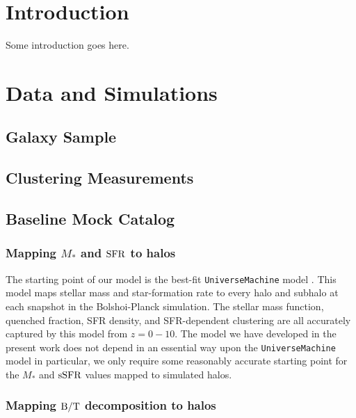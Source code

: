 \documentclass[usenatbib,usegraphicx,letterpaper]{mn2e}
\newcommand{\bt}{{\rm B/T}}
\newcommand{\mstar}{M_{\ast}}
\newcommand{\ssfr}{{\rm sSFR}}
\newcommand{\sfr}{{\rm SFR}}
\begin{document}
\section{Introduction}
\label{sec:intro}
Some introduction goes here.

\section{Data and Simulations}
\label{sec:data}

\subsection{Galaxy Sample}
\label{subsec:galaxydata}

\subsection{Clustering Measurements}
\label{subsec:clusteringmeasurements}

\subsection{Baseline Mock Catalog}
\label{subsec:baselinemock}

\subsubsection{Mapping $\mstar$ and $\sfr$ to halos}
\label{subsubsec:umachine}
The starting point of our model is the best-fit {\tt UniverseMachine} model \citep[][in prep]{behroozi_etal17}. This model maps stellar mass and star-formation rate to every halo and subhalo at each snapshot in the Bolshoi-Planck simulation. The stellar mass function, quenched fraction, SFR density, and SFR-dependent clustering are all accurately captured by this model from $z=0-10.$ The model we have developed in the present work does not depend in an essential way upon the {\tt UniverseMachine} model in particular, we only require some reasonably accurate starting point for the $\mstar$ and $\ssfr$ values mapped to simulated halos. 

\subsubsection{Mapping $\bt$ decomposition to halos}
\label{subsubsec:random_bt_model}
\end{document}
